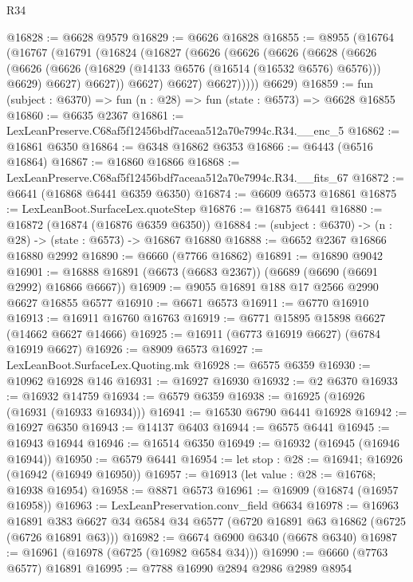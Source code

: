 \begin{lexlean}{R34}
\begin{coremodule}
@16828 := @6628 @9579
@16829 := @6626 @16828
@16855 := @8955
    (@16764
      (@16767
        (@16791
          (@16824
            (@16827
              (@6626
                (@6626
                  (@6626
                    (@6628
                      (@6626
                        (@6626
                          (@6626 (@16829 (@14133 @6576 (@16514 (@16532 @6576) @6576))) @6629)
                          @6627)
                        @6627))
                    @6627)
                  @6627)
                @6627)))))
      @6629)
@16859 := fun (subject : @6370) => fun (n : @28) => fun (state : @6573) => @6628 @16855
@16860 := @6635 @2367
@16861 := LexLeanPreserve.C68af5f12456bdf7aceaa512a70e7994c.R34.__enc_5
@16862 := @16861 @6350
@16864 := @6348 @16862 @6353
@16866 := @6443 (@6516 @16864)
@16867 := @16860 @16866
@16868 := LexLeanPreserve.C68af5f12456bdf7aceaa512a70e7994c.R34.__fits_67
@16872 := @6641 (@16868 @6441 @6359 @6350)
@16874 := @6609 @6573 @16861
@16875 := LexLeanBoot.SurfaceLex.quoteStep
@16876 := @16875 @6441
@16880 := @16872 (@16874 (@16876 @6359 @6350))
@16884 := (subject : @6370) -> (n : @28) -> (state : @6573) -> @16867 @16880
@16888 := @6652 @2367 @16866 @16880 @2992
@16890 := @6660 (@7766 @16862)
@16891 := @16890 @9042
@16901 := @16888 @16891 (@6673 (@6683 @2367)) (@6689 (@6690 (@6691 @2992) @16866 @6667))
@16909 := @9055 @16891 @188 @17 @2566 @2990 @6627 @16855 @6577
@16910 := @6671 @6573
@16911 := @6770 @16910
@16913 := @16911 @16760 @16763
@16919 := @6771 @15895 @15898 @6627 (@14662 @6627 @14666)
@16925 := @16911 (@6773 @16919 @6627) (@6784 @16919 @6627)
@16926 := @8909 @6573
@16927 := LexLeanBoot.SurfaceLex.Quoting.mk
@16928 := @6575 @6359
@16930 := @10962 @16928 @146
@16931 := @16927 @16930
@16932 := @2 @6370
@16933 := @16932 @14759
@16934 := @6579 @6359
@16938 := @16925 (@16926 (@16931 (@16933 @16934)))
@16941 := @16530 @6790 @6441 @16928
@16942 := @16927 @6350
@16943 := @14137 @6403
@16944 := @6575 @6441
@16945 := @16943 @16944
@16946 := @16514 @6350
@16949 := @16932 (@16945 (@16946 @16944))
@16950 := @6579 @6441
@16954 := let stop : @28 := @16941; @16926 (@16942 (@16949 @16950))
@16957 := @16913 (let value : @28 := @16768; @16938 @16954)
@16958 := @8871 @6573
@16961 := @16909 (@16874 (@16957 @16958))
@16963 := LexLeanPreservation.conv_field @6634
@16978 := @16963
    @16891
    @383
    @6627
    @34
    @6584
    @34
    @6577
    (@6720 @16891 @63 @16862 (@6725 (@6726 @16891 @63)))
@16982 := @6674 @6900 @6340 (@6678 @6340)
@16987 := @16961 (@16978 (@6725 (@16982 @6584 @34)))
@16990 := @6660 (@7763 @6577) @16891
@16995 := @7788 @16990 @2894 @2986 @2989 @8954

\end{coremodule}
\end{lexlean}
